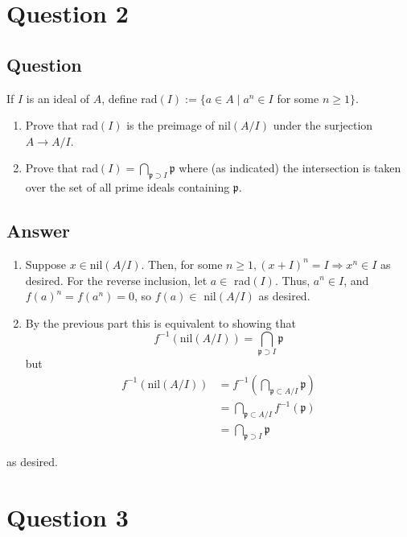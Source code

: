 \documentclass[11pt]{article}
\begin{document}
\section{Question 2}\label{exx}
\subsection{Question}
If $I$ is an ideal of $A$, define rad$(I) := \{a\in A \mid a^n \in I$ for some $n \geq 1\}$.
\begin{enumerate}
\item Prove that rad$(I)$ is the preimage of nil$(A / I)$ under the surjection $A \to A/I$.
\item \label{earlier} Prove that rad$(I) = \bigcap_{\mathfrak{p} \supset I}\mathfrak{p}$ where (as indicated) the intersection is taken over the set of all prime ideals containing $\mathfrak{p}$.
\end{enumerate}
\subsection{Answer}
\begin{enumerate}
\item Suppose $x \in $nil$(A/ I)$. Then, for some $n \geq 1, (x+I)^n = I \Rightarrow x^n \in I$   as desired.  For the reverse inclusion, let $a \in $ rad$(I)$. Thus, $a^n \in I$, and $f(a)^n = f(a^n) = 0$, so $f(a) \in $ nil$(A/I)$ as desired.
\item By the previous part this is equivalent to showing that
\[f^{-1}(\mbox{nil}(A/I)) = \bigcap_{\mathfrak{p} \supset I} \mathfrak{p}\]
but
\begin{align*}
f^{-1}(\mbox{nil}(A/I)) &= f^{-1} (  \bigcap_{\mathfrak{p} \subset A/I} \mathfrak{p} ) \\
&= \bigcap_{\mathfrak{p} \subset A/I} f^{-1}(\mathfrak{p} ) \\
&= \bigcap_{ \mathfrak{p} \supset I}\mathfrak{p}  
\end{align*}
\end{enumerate}
as desired.

\section{Question 3}
\end{document}
